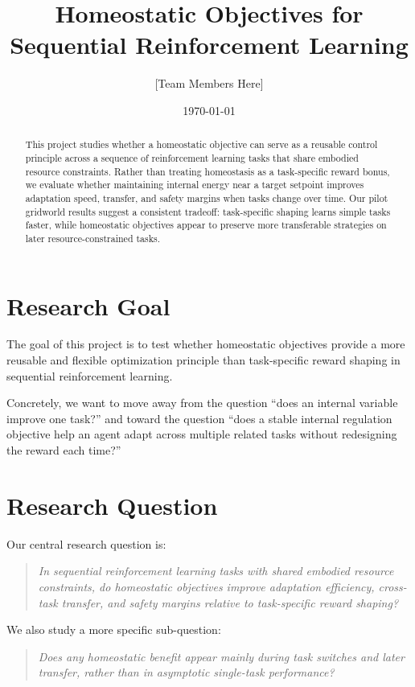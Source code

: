 \documentclass[11pt]{article}
\title{Homeostatic Objectives for Sequential Reinforcement Learning}
\author{
    [Team Members Here] \\
    [Course Name Here]
}
\date{\today}
\begin{document}
\maketitle

\begin{abstract}
This project studies whether a homeostatic objective can serve as a reusable control principle across a sequence of reinforcement learning tasks that share embodied resource constraints. Rather than treating homeostasis as a task-specific reward bonus, we evaluate whether maintaining internal energy near a target setpoint improves adaptation speed, transfer, and safety margins when tasks change over time. Our pilot gridworld results suggest a consistent tradeoff: task-specific shaping learns simple tasks faster, while homeostatic objectives appear to preserve more transferable strategies on later resource-constrained tasks.
\end{abstract}

\section{Research Goal}
The goal of this project is to test whether homeostatic objectives provide a more reusable and flexible optimization principle than task-specific reward shaping in sequential reinforcement learning.

Concretely, we want to move away from the question ``does an internal variable improve one task?'' and toward the question ``does a stable internal regulation objective help an agent adapt across multiple related tasks without redesigning the reward each time?''

\section{Research Question}
Our central research question is:

\begin{quote}
\textit{In sequential reinforcement learning tasks with shared embodied resource constraints, do homeostatic objectives improve adaptation efficiency, cross-task transfer, and safety margins relative to task-specific reward shaping?}
\end{quote}

\noindent We also study a more specific sub-question:

\begin{quote}
\textit{Does any homeostatic benefit appear mainly during task switches and later transfer, rather than in asymptotic single-task performance?}
\end{quote}
\end{document}
